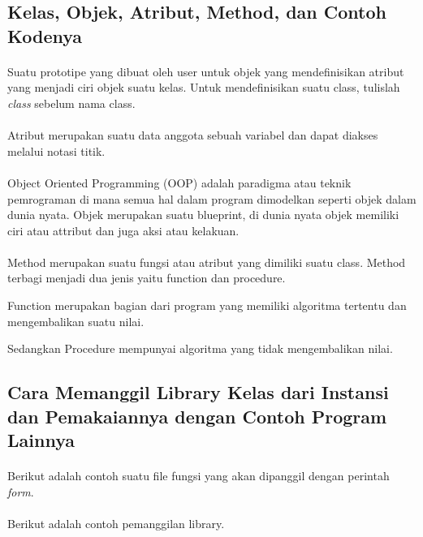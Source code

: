 \subsection{Kelas, Objek, Atribut, Method, dan Contoh Kodenya}
\paragraph{}
    Suatu prototipe yang dibuat oleh user untuk objek yang mendefinisikan atribut yang menjadi ciri objek suatu kelas. Untuk mendefinisikan suatu class, tulislah \textit{class} sebelum nama class.
\paragraph{}
    Atribut merupakan suatu data anggota sebuah variabel dan dapat diakses melalui notasi titik.
\paragraph{}
    Object Oriented Programming (OOP) adalah paradigma atau teknik pemrograman di mana semua hal dalam program dimodelkan seperti objek dalam dunia nyata. Objek merupakan suatu blueprint, di dunia nyata objek memiliki ciri atau attribut dan juga aksi atau kelakuan.
\paragraph{}
    Method merupakan suatu fungsi atau atribut yang dimiliki suatu class. Method terbagi menjadi dua jenis yaitu function dan procedure. 
\par Function merupakan bagian dari program yang memiliki algoritma tertentu dan mengembalikan suatu nilai.
\par Sedangkan Procedure mempunyai algoritma yang tidak mengembalikan nilai.


\subsection{Cara Memanggil Library Kelas dari Instansi dan Pemakaiannya dengan Contoh Program Lainnya}
\paragraph{}
    Berikut adalah contoh suatu file fungsi yang akan dipanggil dengan perintah \textit{form}.

\paragraph{}
    Berikut adalah contoh pemanggilan library.


